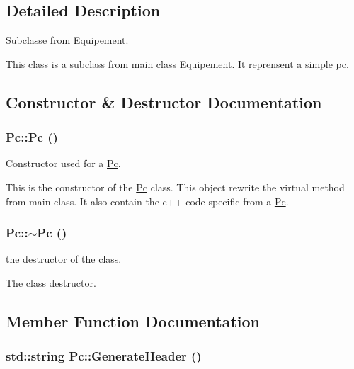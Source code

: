 \subsection{Detailed Description}
Subclasse from \hyperlink{class_equipement}{Equipement}. 

This class is a subclass from main class \hyperlink{class_equipement}{Equipement}. It reprensent a simple pc. 

\subsection{Constructor \& Destructor Documentation}
\hypertarget{class_pc_ef7314496cee3c1bd2c329aac4dc4f21}{
\subsubsection[{Pc}]{\setlength{\rightskip}{0pt plus 5cm}Pc::Pc ()}}
\label{class_pc_ef7314496cee3c1bd2c329aac4dc4f21}


Constructor used for a \hyperlink{class_pc}{Pc}. 

This is the constructor of the \hyperlink{class_pc}{Pc} class. This object rewrite the virtual method from main class. It also contain the c++ code specific from a \hyperlink{class_pc}{Pc}. \hypertarget{class_pc_b15cb9b9bfb8a9d9ff964091e1a63cec}{
\subsubsection[{$\sim$Pc}]{\setlength{\rightskip}{0pt plus 5cm}Pc::$\sim$Pc ()}}
\label{class_pc_b15cb9b9bfb8a9d9ff964091e1a63cec}


the destructor of the class. 

The class destructor. 

\subsection{Member Function Documentation}
\hypertarget{class_pc_0b152acc530cc73f502f046e19f9344f}{
\subsubsection[{GenerateHeader}]{\setlength{\rightskip}{0pt plus 5cm}std::string Pc::GenerateHeader ()}}
\label{class_pc_0b152acc530cc73f502f046e19f9344f}


